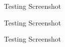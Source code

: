 \documentclass[a4paper, 11pt]{article}
\begin{document}
\begin{appendix}
\begin{multicols}{2}
\begin{figure}[H]
\centering
\caption{Testing Screenshot}
\label{RunnerScreenshot2}
\end{figure}

\begin{figure}[H]
\centering
\caption{Testing Screenshot}
\label{RunnerScreenshot3}
\end{figure}

\begin{figure}[H]
\centering
\caption{Testing Screenshot}
\label{RunnerScreenshot4}
\end{figure}

\end{multicols}

\end{appendix}
\end{document}
